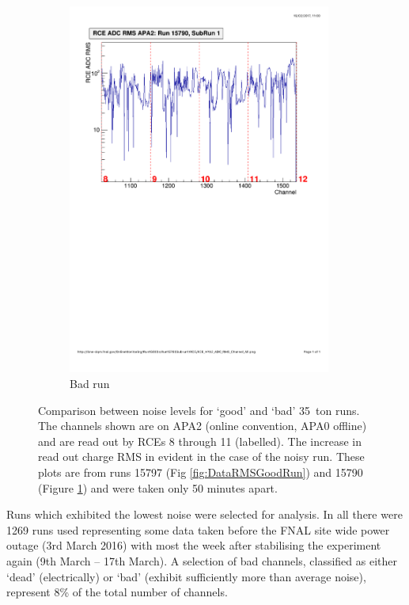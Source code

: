 \begin{figure}[h]
\begin{subfigure}{0.45\linewidth}
    \centering
    \includegraphics[width=0.95\textwidth]{DataRMSBad.pdf}
    \caption{Bad run}
    \label{fig:DataRMSBadRun}
  \end{subfigure}
  \caption[`Good' and `bad' 35~ton runs]{Comparison between noise levels for `good' and `bad' 35~ton runs.  The channels shown are on APA2 (online convention, APA0 offline) and are read out by RCEs 8 through 11 (labelled).  The increase in read out charge RMS in evident in the case of the noisy run.  These plots are from runs 15797 (Fig \ref{fig:DataRMSGoodRun}) and 15790 (Figure \ref{fig:DataRMSBadRun}) and were taken only 50 minutes apart.}
  \label{fig:DataRMS}
\end{figure}

Runs which exhibited the lowest noise were selected for analysis.  In all there were 1269 runs used representing some data taken before the FNAL site wide power outage (3rd March 2016) with most the week after stabilising the experiment again (9th March -- 17th March).  A selection of bad channels, classified as either `dead' (electrically) or `bad' (exhibit sufficiently more than average noise), represent 8\% of the total number of channels.

